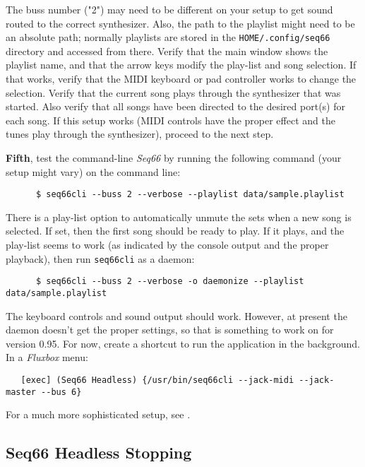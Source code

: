    The buss number ("2") may need to be different on your setup to get sound
   routed to the correct synthesizer.
   Also, the path to the playlist might
   need to be an absolute path; normally playlists are stored in the
   \texttt{HOME/.config/seq66} directory and accessed from there.
   Verify that the main window shows the playlist name,
   and that the arrow keys modify the
   play-list and song selection.
   If that works, verify that the MIDI keyboard
   or pad controller works to change the selection.
   Verify that the current
   song plays through the synthesizer that was started.
   Also verify that all
   songs have been directed to the desired port(s) for each song.
   If this setup works (MIDI controls have the proper effect and the tunes play
   through the synthesizer), proceed to the next step.

   \textbf{Fifth}, test the command-line \textsl{Seq66} by running the
   following command (your setup might vary) on the command line:

   \begin{verbatim}
      $ seq66cli --buss 2 --verbose --playlist data/sample.playlist
   \end{verbatim}

   There is a play-list option to automatically unmute the sets when a new song
   is selected.  If set, then the first song should be ready to play.
   If it plays, and the play-list seems to work (as indicated by the console
   output and the proper playback), then run \texttt{seq66cli} as a daemon:

   \begin{verbatim}
      $ seq66cli --buss 2 --verbose -o daemonize --playlist data/sample.playlist
   \end{verbatim}

   The keyboard controls and sound output should work.
   However, at present the daemon doesn't get the proper settings, so that is
   something to work on for version 0.95.
   For now, create a shortcut to run the application in the background.
   In a \textsl{Fluxbox} menu:

   \begin{verbatim}
   [exec] (Seq66 Headless) {/usr/bin/seq66cli --jack-midi --jack-master --bus 6}
   \end{verbatim}

   For a much more sophisticated setup, see .

\subsection{Seq66 Headless Stopping}
\label{subsec:headless_stopping}

